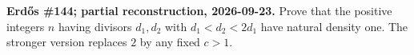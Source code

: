 \textbf{Erd\H{o}s \#144; partial reconstruction, 2026-09-23.}
Prove that the positive integers $n$ having divisors $d_1,d_2$ with
$d_1<d_2<2d_1$ have natural density one. The stronger version replaces
$2$ by any fixed $c>1$.
